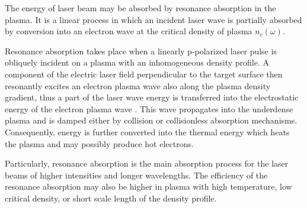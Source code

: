 The energy of laser beam may be absorbed by resonance absorption in the plasma. It is a linear process in which an incident laser wave is partially absorbed by conversion into an electron wave at the critical density of plasma $ n_c (\omega) $.

Resonance absorption takes place when a linearly p-polarized laser pulse is obliquely incident on a plasma with an inhomogeneous density profile. A component of the electric laser field perpendicular to the target surface then resonantly excites an electron plasma wave also along the plasma density gradient, thus a part of the laser wave energy is transferred into the electrostatic energy of the electron plasma wave \cite{eliezer}. This wave propagates into the underdense plasma and is damped either by collision or collisionless absorption mechanisms. Consequently, energy is further converted into the thermal energy which heats the plasma and may possibly produce hot electrons.

Particularly, resonance absorption is the main absorption process for the laser beams of higher intensities and longer wavelengths. The efficiency of the resonance absorption may also be higher in plasma with high temperature, low critical density, or short scale length of the density profile.
